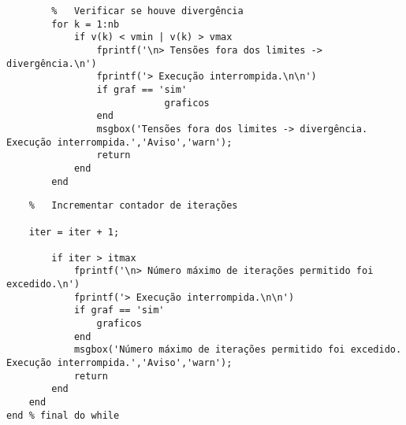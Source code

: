 \begin{verbatim}
        %	Verificar se houve divergência
        for k = 1:nb
            if v(k) < vmin | v(k) > vmax
                fprintf('\n> Tensões fora dos limites -> divergência.\n')
                fprintf('> Execução interrompida.\n\n')
                if graf == 'sim'
                            graficos
                end
                msgbox('Tensões fora dos limites -> divergência. Execução interrompida.','Aviso','warn');
                return
            end
        end
\end{verbatim}
\begin{verbatim}
    %	Incrementar contador de iterações

    iter = iter + 1;

        if iter > itmax
            fprintf('\n> Número máximo de iterações permitido foi excedido.\n')
            fprintf('> Execução interrompida.\n\n')
            if graf == 'sim'
                graficos
            end
            msgbox('Número máximo de iterações permitido foi excedido. Execução interrompida.','Aviso','warn');
            return
        end
    end
end	% final do while
\end{verbatim}

